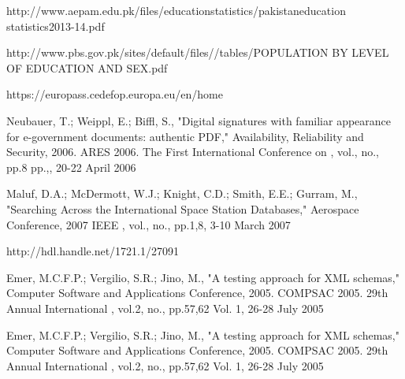 \documentclass[12pt,a4paper,oneside]{book}
\begin{document}
\begin{thebibliography}{10}
http://www.aepam.edu.pk/files/educationstatistics/pakistaneducation
statistics2013-14.pdf

http://www.pbs.gov.pk/sites/default/files//tables/POPULATION BY LEVEL OF EDUCATION AND SEX.pdf

https://europass.cedefop.europa.eu/en/home

Neubauer, T.; Weippl, E.; Biffl, S., "Digital signatures with familiar appearance for e-government documents: authentic PDF," Availability, Reliability and Security, 2006. ARES 2006. The First International Conference on , vol., no., pp.8 pp.,, 20-22 April 2006

Maluf, D.A.; McDermott, W.J.; Knight, C.D.; Smith, E.E.; Gurram, M., "Searching Across the International Space Station Databases," Aerospace Conference, 2007 IEEE , vol., no., pp.1,8, 3-10 March 2007

http://hdl.handle.net/1721.1/27091

Emer, M.C.F.P.; Vergilio, S.R.; Jino, M., "A testing approach for XML schemas," Computer Software and Applications Conference, 2005. COMPSAC 2005. 29th Annual International , vol.2, no., pp.57,62 Vol. 1, 26-28 July 2005

Emer, M.C.F.P.; Vergilio, S.R.; Jino, M., "A testing approach for XML schemas," Computer Software and Applications Conference, 2005. COMPSAC 2005. 29th Annual International , vol.2, no., pp.57,62 Vol. 1, 26-28 July 2005

\end{thebibliography}
\end{document}
